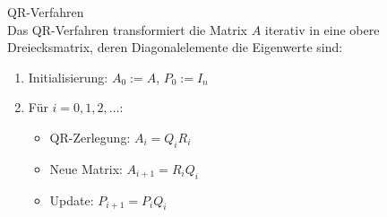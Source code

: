 \begin{concept}{QR-Verfahren}\\
Das QR-Verfahren transformiert die Matrix $A$ iterativ in eine obere Dreiecksmatrix, deren Diagonalelemente die Eigenwerte sind:
\begin{enumerate}
    \item Initialisierung: $A_0 := A$, $P_0 := I_n$
    \item Für $i = 0,1,2,\ldots$:
    \begin{itemize}
        \item QR-Zerlegung: $A_i = Q_iR_i$
        \item Neue Matrix: $A_{i+1} = R_iQ_i$
        \item Update: $P_{i+1} = P_iQ_i$
    \end{itemize}
\end{enumerate}
\end{concept}

